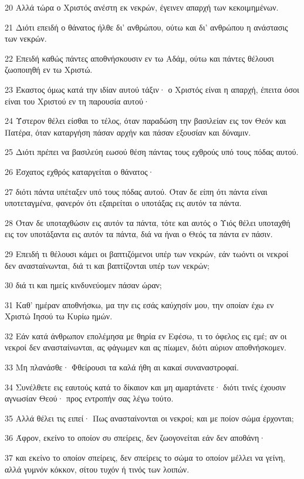 \par 20 Αλλά τώρα ο Χριστός ανέστη εκ νεκρών, έγεινεν απαρχή των κεκοιμημένων.
\par 21 Διότι επειδή ο θάνατος ήλθε δι' ανθρώπου, ούτω και δι' ανθρώπου η ανάστασις των νεκρών.
\par 22 Επειδή καθώς πάντες αποθνήσκουσιν εν τω Αδάμ, ούτω και πάντες θέλουσι ζωοποιηθή εν τω Χριστώ.
\par 23 Έκαστος όμως κατά την ιδίαν αυτού τάξιν· ο Χριστός είναι η απαρχή, έπειτα όσοι είναι του Χριστού εν τη παρουσία αυτού·
\par 24 Ύστερον θέλει είσθαι το τέλος, όταν παραδώση την βασιλείαν εις τον Θεόν και Πατέρα, όταν καταργήση πάσαν αρχήν και πάσαν εξουσίαν και δύναμιν.
\par 25 Διότι πρέπει να βασιλεύη εωσού θέση πάντας τους εχθρούς υπό τους πόδας αυτού.
\par 26 Έσχατος εχθρός καταργείται ο θάνατος·
\par 27 διότι πάντα υπέταξεν υπό τους πόδας αυτού. Όταν δε είπη ότι πάντα είναι υποτεταγμένα, φανερόν ότι εξαιρείται ο υποτάξας εις αυτόν τα πάντα.
\par 28 Όταν δε υποταχθώσιν εις αυτόν τα πάντα, τότε και αυτός ο Υιός θέλει υποταχθή εις τον υποτάξαντα εις αυτόν τα πάντα, διά να ήναι ο Θεός τα πάντα εν πάσιν.
\par 29 Επειδή τι θέλουσι κάμει οι βαπτιζόμενοι υπέρ των νεκρών, εάν τωόντι οι νεκροί δεν ανασταίνωνται, διά τι και βαπτίζονται υπέρ των νεκρών;
\par 30 διά τι και ημείς κινδυνεύομεν πάσαν ώραν;
\par 31 Καθ' ημέραν αποθνήσκω, μα την εις εσάς καύχησίν μου, την οποίαν έχω εν Χριστώ Ιησού τω Κυρίω ημών.
\par 32 Εάν κατά άνθρωπον επολέμησα με θηρία εν Εφέσω, τι το όφελος εις εμέ; αν οι νεκροί δεν ανασταίνωνται, ας φάγωμεν και ας πίωμεν, διότι αύριον αποθνήσκομεν.
\par 33 Μη πλανάσθε· Φθείρουσι τα καλά ήθη αι κακαί συναναστροφαί.
\par 34 Συνέλθετε εις εαυτούς κατά το δίκαιον και μη αμαρτάνετε· διότι τινές έχουσιν αγνωσίαν Θεού· προς εντροπήν σας λέγω τούτο.
\par 35 Αλλά θέλει τις ειπεί· Πως ανασταίνονται οι νεκροί; και με ποίον σώμα έρχονται;
\par 36 Άφρον, εκείνο το οποίον συ σπείρεις, δεν ζωογονείται εάν δεν αποθάνη·
\par 37 και εκείνο το οποίον σπείρεις, δεν σπείρεις το σώμα το οποίον μέλλει να γείνη, αλλά γυμνόν κόκκον, σίτου τυχόν ή τινός των λοιπών.
